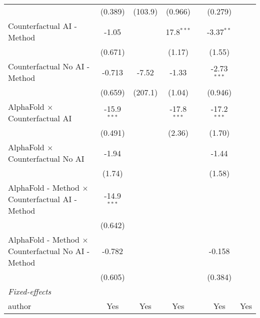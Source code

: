 \begin{tabular}{lcccccc}
                                                              & (0.389)       & (103.9)        & (0.966)       &      & (0.279)       &   \\   
   Counterfactual AI - Method                                 & -1.05         &                & 17.8$^{***}$  &      & -3.37$^{**}$  &   \\   
                                                              & (0.671)       &                & (1.17)        &      & (1.55)        &   \\   
   Counterfactual No AI - Method                              & -0.713        & -7.52          & -1.33         &      & -2.73$^{***}$ &   \\   
                                                              & (0.659)       & (207.1)        & (1.04)        &      & (0.946)       &   \\   
   AlphaFold $\times$ Counterfactual AI                       & -15.9$^{***}$ &                & -17.8$^{***}$ &      & -17.2$^{***}$ &   \\   
                                                              & (0.491)       &                & (2.36)        &      & (1.70)        &   \\   
   AlphaFold $\times$ Counterfactual No AI                    & -1.94         &                &               &      & -1.44         &   \\   
                                                              & (1.74)        &                &               &      & (1.58)        &   \\   
   AlphaFold - Method $\times$ Counterfactual AI - Method     & -14.9$^{***}$ &                &               &      &               &   \\   
                                                              & (0.642)       &                &               &      &               &   \\   
   AlphaFold - Method $\times$ Counterfactual No AI - Method  & -0.782        &                &               &      & -0.158        &   \\   
                                                              & (0.605)       &                &               &      & (0.384)       &   \\   
   \midrule
   \emph{Fixed-effects}\\
   author                                                     & Yes           & Yes            & Yes           &      & Yes           & Yes\\  

\end{tabular}
